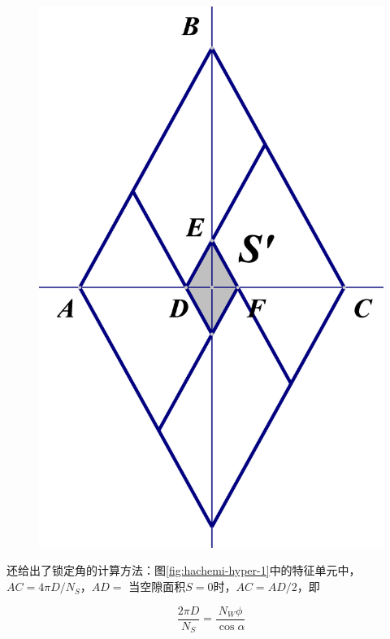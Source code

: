 \begin{figure}[!htb]
{	\includegraphics[height=0.22\textheight]{figure/experiment/hachemi-hyper-2}
	\label{fig:hachemi-hyper-2}
}
\label{fig:hachemi-hyper}
\end{figure}


\citeauthor{Hachemi2011}还给出了锁定角的计算方法：图\ref{fig:hachemi-hyper-1}中的特征单元中，
$ AC = 4\pi D/{N_S} $，$ AD =  $
当空隙面积$ S=0 $时，$ AC = AD/2 $，即








\begin{equation}
\frac{{2\pi D}}{{{N_S}}} = \frac{{{N_W}\phi }}{{\cos \alpha }}
\end{equation}

